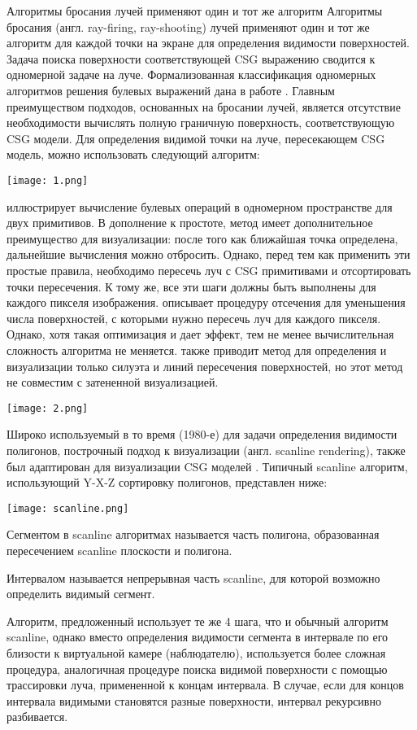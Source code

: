 {{{{{{{Алгоритмы бросания лучей  применяют один и тот же алгоритм 
Алгоритмы бросания (англ. ray-firing, ray-shooting) лучей  применяют один и тот же алгоритм для каждой точки на экране для определения видимости поверхностей. Задача поиска поверхности соответствующей CSG выражению сводится к одномерной задаче на луче. Формализованная классификация одномерных алгоритмов решения булевых выражений дана в работе . Главным преимуществом подходов, основанных на бросании лучей, является отсутствие необходимости вычислять полную граничную поверхность, соответствующую CSG модели. Для определения видимой точки на луче, пересекающем CSG модель, можно использовать следующий алгоритм:

\texttt{[image: 1.png]}

 иллюстрирует вычисление булевых операций в одномерном пространстве для двух примитивов. В дополнение к простоте, метод имеет дополнительное преимущество для визуализации: после того как ближайшая точка определена, дальнейшие вычисления можно отбросить. Однако, перед тем как применить эти простые правила, необходимо пересечь луч с CSG примитивами и отсортировать точки пересечения. К тому же, все эти шаги должны быть выполнены для каждого пикселя изображения. \todo{[Roth]} описывает процедуру отсечения для уменьшения числа поверхностей, с которыми нужно пересечь луч для каждого пикселя. Однако, хотя такая оптимизация и дает эффект, тем не менее вычислительная сложность алгоритма не меняется. \todo{[Roth]} также приводит метод для определения и визуализации только силуэта и линий пересечения поверхностей, но этот метод не совместим с затененной визуализацией.

\texttt{[image: 2.png]}}

Широко используемый в то время (1980-е) для задачи определения видимости полигонов, построчный подход к визуализации (англ. scanline rendering), также был адаптирован для визуализации CSG моделей \todo{[atherton1983]}. Типичный scanline алгоритм, использующий Y-X-Z сортировку полигонов, представлен ниже:

\texttt{[image: scanline.png]}}

Сегментом в scanline алгоритмах называется часть полигона, образованная пересечением scanline плоскости и полигона.

Интервалом называется непрерывная часть scanline, для которой возможно определить видимый сегмент. 

Алгоритм, предложенный \todo{[atherton1983]} использует те же 4 шага, что и обычный алгоритм scanline, однако вместо определения видимости сегмента в интервале по его близости к виртуальной камере (наблюдателю), используется более сложная процедура, аналогичная процедуре поиска видимой поверхности с помощью трассировки луча, примененной к концам интервала. В случае, если для концов интервала видимыми становятся разные поверхности, интервал рекурсивно разбивается.

}}}}}
